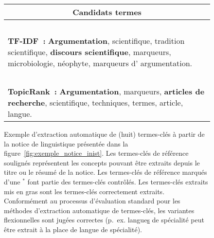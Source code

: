 \begin{figure}
\begin{minipage}{\linewidth}
{{\begin{tabular}{lll}
              \multicolumn{3}{c}{Candidats termes}\\
              \hline~\vspace{-0.75em}\\
              \multicolumn{3}{p{.975\linewidth}}{\textbf{TF-IDF~:}
                \textbf{Argumentation},
                scientifique,
                tradition scientifique,
                \textbf{discours scientifique},
                marqueurs,
                microbiologie,
                néophyte,
                marqueurs d' argumentation.
              }\\~\vspace{-0.75em}\\
              \multicolumn{3}{p{.975\linewidth}}{\textbf{TopicRank~:}
                \textbf{Argumentation},
                marqueurs,
                \textbf{articles de recherche},
                scientifique,
                techniques,
                termes,
                article,
                langue.
              }\\
            \end{tabular}
          }
        }
      \end{minipage}
      \caption{Exemple d'extraction automatique de (huit) termes-clés à partir
               de la notice de linguistique présentée dans la
               figure~\ref{fig:exemple_notice_inist}. Les termes-clés de
               référence soulignés représentent les concepts pouvant être
               extraits depuis le titre ou le résumé de la notice. Les
               termes-clés de référence marqués d'une $^*$ font partie des
               termes-clés contrôlés. Les termes-clés extraits mis en gras sont
               les termes-clés correctement extraits. Conformément au processus
               d'évaluation standard pour les méthodes d'extraction automatique
               de termes-clés, les variantes flexionnelles sont jugées correctes
               (p.~ex. \og{}langue\underline{s} de spécialité\fg{} peut être
               extrait à la place de \og{}langue de spécialité\fg{}).
               \label{fig:exemple_extraction}}
    \end{figure}

